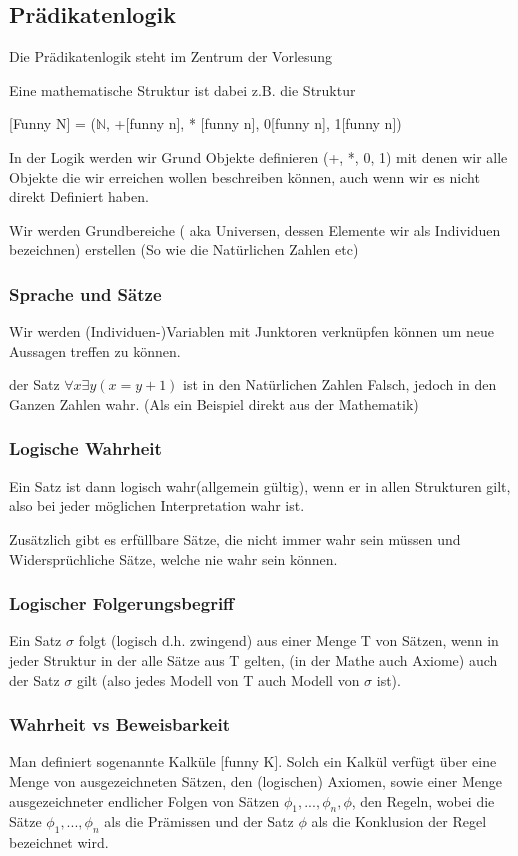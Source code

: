 \documentclass[12pt,a4paper]{article} %
\begin{document}
\subsection{Prädikatenlogik}
Die Prädikatenlogik steht im Zentrum der Vorlesung

Eine mathematische Struktur ist dabei z.B. die Struktur

[Funny N] = ($ \mathbb{N} $, +[funny n], * [funny n], 0[funny n], 1[funny n])

In der Logik werden wir Grund Objekte definieren (+, *, 0, 1) mit denen wir alle Objekte die wir erreichen wollen beschreiben können, auch wenn wir es nicht direkt Definiert haben.

Wir werden Grundbereiche ( aka Universen, dessen Elemente wir als Individuen bezeichnen) erstellen (So wie die Natürlichen Zahlen etc)

\subsubsection{Sprache und Sätze}
Wir werden (Individuen-)Variablen mit Junktoren verknüpfen können um neue Aussagen treffen zu können.

der Satz $\forall x\exists y(x = y + 1)$ ist in den Natürlichen Zahlen Falsch, jedoch in den Ganzen Zahlen wahr. (Als ein Beispiel direkt aus der Mathematik)

\subsubsection{Logische Wahrheit}
Ein Satz ist dann logisch wahr(allgemein gültig), wenn er in allen Strukturen gilt, also bei jeder möglichen Interpretation wahr ist.

Zusätzlich gibt es erfüllbare Sätze, die nicht immer wahr sein müssen und Widersprüchliche Sätze, welche nie wahr sein können.

\subsubsection{Logischer Folgerungsbegriff}
Ein Satz $\sigma$ folgt (logisch d.h. zwingend) aus einer Menge T von Sätzen, wenn in jeder Struktur in der alle Sätze aus T gelten, (in der Mathe auch Axiome) auch der Satz $\sigma$ gilt (also jedes Modell von T auch Modell von $\sigma$ ist).

\subsubsection{Wahrheit vs Beweisbarkeit}
Man definiert sogenannte Kalküle [funny K]. Solch ein Kalkül verfügt über eine Menge von ausgezeichneten Sätzen, den (logischen) Axiomen, sowie einer Menge ausgezeichneter endlicher Folgen von Sätzen $\phi_1, ..., \phi_n, \phi$, den Regeln, wobei die Sätze  $\phi_1, ..., \phi_n$ als die Prämissen und der Satz $\phi$ als die Konklusion der Regel bezeichnet wird.
\end{document}
